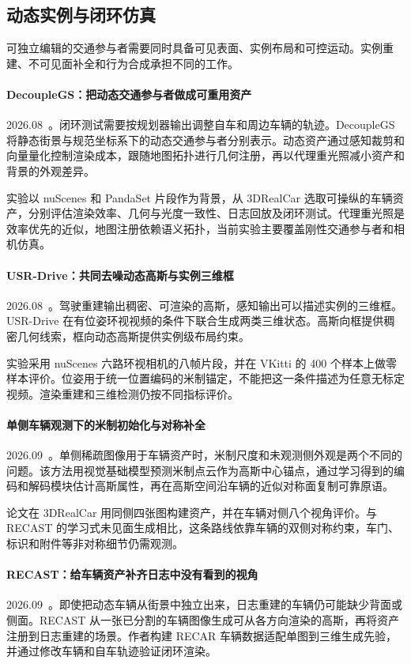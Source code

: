 \subsection{动态实例与闭环仿真}

可独立编辑的交通参与者需要同时具备可见表面、实例布局和可控运动。实例重建、不可见面补全和行为合成承担不同的工作。

\paragraph{DecoupleGS：把动态交通参与者做成可重用资产}
2026.08~\cite{2608_01761}。闭环测试需要按规划器输出调整自车和周边车辆的轨迹。DecoupleGS 将静态街景与规范坐标系下的动态交通参与者分别表示。动态资产通过感知裁剪和向量量化控制渲染成本，跟随地图拓扑进行几何注册，再以代理重光照减小资产和背景的外观差异。

实验以 nuScenes 和 PandaSet 片段作为背景，从 3DRealCar 选取可操纵的车辆资产，分别评估渲染效率、几何与光度一致性、日志回放及闭环测试。代理重光照是效率优先的近似，地图注册依赖语义拓扑，当前实验主要覆盖刚性交通参与者和相机仿真。

\paragraph{USR-Drive：共同去噪动态高斯与实例三维框}
2026.08~\cite{2608_19036}。驾驶重建输出稠密、可渲染的高斯，感知输出可以描述实例的三维框。USR-Drive 在有位姿环视视频的条件下联合生成两类三维状态。高斯向框提供稠密几何线索，框向动态高斯提供实例级布局约束。

实验采用 nuScenes 六路环视相机的八帧片段，并在 VKitti 的 400 个样本上做零样本评价。位姿用于统一位置编码的米制锚定，不能把这一条件描述为任意无标定视频。渲染重建和三维检测仍按不同指标评价。

\paragraph{单侧车辆观测下的米制初始化与对称补全}
2026.09~\cite{2609_08841}。单侧稀疏图像用于车辆资产时，米制尺度和未观测侧外观是两个不同的问题。该方法用视觉基础模型预测米制点云作为高斯中心锚点，通过学习得到的编码和解码模块估计高斯属性，再在高斯空间沿车辆的近似对称面复制可靠原语。

论文在 3DRealCar 用同侧四张图构建资产，并在车辆对侧八个视角评价。与 RECAST 的学习式未见面生成相比，这条路线依靠车辆的双侧对称约束，车门、标识和附件等非对称细节仍需观测。

\paragraph{RECAST：给车辆资产补齐日志中没有看到的视角}
2026.09~\cite{2609_31374}。即使把动态车辆从街景中独立出来，日志重建的车辆仍可能缺少背面或侧面。RECAST 从一张已分割的车辆图像生成可从各方向渲染的高斯，再将资产注册到日志重建的场景。作者构建 RECAR 车辆数据适配单图到三维生成先验，并通过修改车辆和自车轨迹验证闭环渲染。

